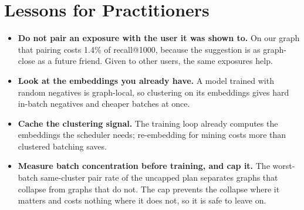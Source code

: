 \section{Lessons for Practitioners}
\label{sec:lessons}

\begin{itemize}[leftmargin=*]
  \item \textbf{Do not pair an exposure with the user it was shown to.} On our graph that pairing costs 1.4\% of
        recall@1000, because the suggestion is as graph-close as a future friend. Given to other users, the same
        exposures help.
  \item \textbf{Look at the embeddings you already have.} A model trained with random negatives is graph-local, so
        clustering on its embeddings gives hard in-batch negatives and cheaper batches at once.
  \item \textbf{Cache the clustering signal.} The training loop already computes the embeddings the scheduler needs;
        re-embedding for mining costs more than clustered batching saves.
  \item \textbf{Measure batch concentration before training, and cap it.} The worst-batch same-cluster pair rate of the
        uncapped plan separates graphs that collapse from graphs that do not. The cap prevents the collapse where it
        matters and costs nothing where it does not, so it is safe to leave on.
\end{itemize}
